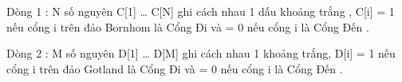 Dòng 1 : N số nguyên C[1] … C[N] ghi cách nhau 1 dấu khoảng trắng , C[i] = 1 nếu cổng i trên đảo Bornhom là Cổng Đi và = 0 nếu cổng i là Cổng Đến .


Dòng 2 : M số nguyên D[1] … D[M] ghi cách nhau 1 khoảng trắng, D[i] = 1 nếu cổng i trên đảo Gotland là Cổng Đi và = 0 nếu cổng i là Cổng Đến .